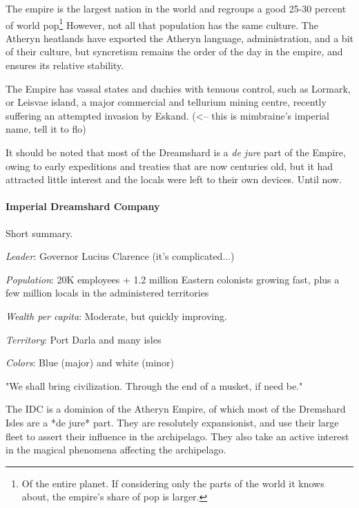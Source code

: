 The empire is the largest nation in the world and regroups a good 25-30 percent of world pop\footnote{Of the entire planet. If considering only the parts of the world it knows about, the empire's share of pop is larger.} However, not all that population has the same culture. The Atheryn heatlands have exported the Atheryn language, administration, and a bit of their culture, but syncretism remains the order of the day in the empire, and ensures its relative stability. 

The Empire has vassal states and duchies with tenuous control, such as Lormark, or Leisvae island, a major commercial and tellurium mining centre, recently suffering an attempted invasion by Eskand. (<-- this is mimbraine's imperial name, tell it to flo)

It should be noted that most of the Dreamshard is a \textit{de jure} part of the Empire, owing to early expeditions and treaties that are now centuries old, but it had attracted little interest and the locals were left to their own devices. Until now.



\paragraph{Imperial Dreamshard Company}

Short summary.

\textit{Leader}: Governor Lucius Clarence (it's complicated...)

\textit{Population}: 20K employees + 1.2 million Eastern colonists growing fast, plus a few million locals in the administered territories

\textit{Wealth per capita}: Moderate, but quickly improving.

\textit{Territory}: Port Darla and many isles

\textit{Colors}: Blue (major) and white (minor)


\begin{rpg-quotebox}
    "We shall bring civilization. Through the end of a musket, if need be."
    \end{rpg-quotebox}
    



The IDC is a dominion of the Atheryn Empire, of which most of the Dremshard Isles are a *de jure* part. They are resolutely expansionist, and use their large fleet to assert their influence in the archipelago. They also take an active interest in the magical phenomena affecting the archipelago.


